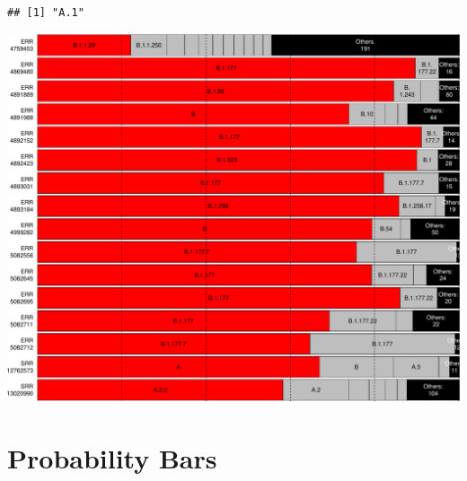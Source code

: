 \documentclass[
]{article}
\begin{document}
\begin{verbatim}
## [1] "A.1"
\end{verbatim}

\includegraphics{pangolin_results_report_d_files/figure-latex/pareto-1.pdf}

\hypertarget{probability-bars}{%
\section{Probability Bars}\label{probability-bars}}
\end{document}
